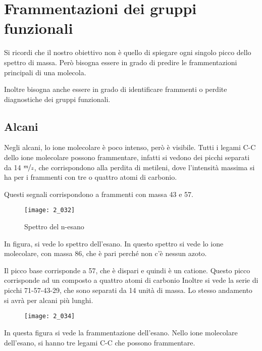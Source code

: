 \section{Frammentazioni dei gruppi funzionali}

Si ricordi che il nostro obiettivo non è quello di spiegare ogni singolo
picco dello spettro di massa. Però bisogna essere in grado di predire le
frammentazioni principali di una molecola.


Inoltre bisogna anche essere in grado di identificare frammenti o
perdite diagnostiche dei gruppi funzionali.

\subsection{Alcani}

Negli alcani, lo ione molecolare è poco intenso, però è visibile. Tutti
i legami C-C dello ione molecolare possono frammentare, infatti si
vedono dei picchi separati da 14 $\nicefrac{m}{z}$, che corrispondono alla perdita di
metileni, dove l'intensità massima si ha per i frammenti con tre o
quattro atomi di carbonio.

Questi segnali corrispondono a frammenti con massa 43 e 57.

\begin{figure}[H]
  \texttt{[image: 2\_032]}
  \caption{Spettro del n-esano}
\end{figure}

In figura, si vede lo spettro dell'esano. In questo spettro si vede lo
ione molecolare, con massa 86, che è pari perché non c'è nessun azoto.

Il picco base corrisponde a 57, che è dispari e quindi è un catione.
Questo picco corrisponde ad un composto a quattro atomi di carbonio
Inoltre si vede la serie di picchi 71-57-43-29, che sono separati da 14
unità di massa. Lo stesso andamento si avrà per alcani più lunghi.


\begin{figure}[H]
  \texttt{[image: 2\_034]}
\end{figure}

In questa figura si vede la frammentazione dell'esano. Nello ione
molecolare dell'esano, si hanno tre legami C-C che possono frammentare.

